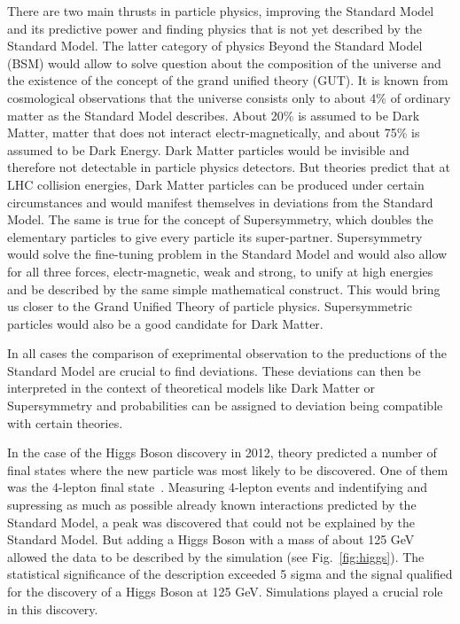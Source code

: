 \documentclass{wscpaperproc}
\theoremstyle{wsc}
\begin{document}
There are two main thrusts in particle physics, improving the Standard Model and its predictive power and finding physics that is not yet described by the Standard Model. The latter category of physics Beyond the Standard Model (BSM) would allow to solve question about the composition of the universe and the existence of the concept of the grand unified theory (GUT). It is known from cosmological observations that the universe consists only to about 4\% of ordinary matter as the Standard Model describes. About 20\% is assumed to be Dark Matter, matter that does not interact electr-magnetically, and about 75\% is assumed to be Dark Energy. Dark Matter particles would be invisible and therefore not detectable in particle physics detectors. But theories predict that at LHC collision energies, Dark Matter particles can be produced under certain circumstances and would manifest themselves in deviations from the Standard Model. The same is true for the concept of Supersymmetry, which doubles the elementary particles to give every particle its super-partner. Supersymmetry would solve the fine-tuning problem in the Standard Model and would also allow for all three forces, electr-magnetic, weak and strong, to unify at high energies and be described by the same simple mathematical construct. This would bring us closer to the Grand Unified Theory of particle physics. Supersymmetric particles would also be a good candidate for Dark Matter.

In all cases the comparison of exeprimental observation to the preductions of the Standard Model are crucial to find deviations. These deviations can then be interpreted in the context of theoretical models like Dark Matter or Supersymmetry and probabilities can be assigned to deviation being compatible with certain theories.

In the case of the Higgs Boson discovery in 2012, theory predicted a number of final states where the new particle was most likely to be discovered. One of them was the 4-lepton final state~. Measuring 4-lepton events and indentifying and supressing as much as possible already known interactions predicted by the Standard Model, a peak was discovered that could not be explained by the Standard Model. But adding a Higgs Boson with a mass of about 125 GeV allowed the data to be described by the simulation (see Fig.~\ref{fig:higgs}). The statistical significance of the description exceeded 5 sigma and the signal qualified for the discovery of a Higgs Boson at 125 GeV. Simulations played a crucial role in this discovery.
\end{document}
